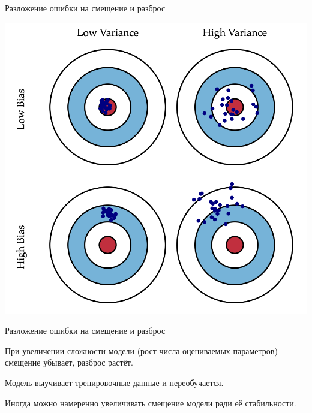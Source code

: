 \documentclass[notes,12pt, aspectratio=169]{beamer}
\newenvironment{wideitemize}{\itemize\addtolength{\itemsep}{10pt}}{\enditemize}
\begin{document}
\begin{frame}{Разложение ошибки на смещение и разброс}
	\begin{center}
		\includegraphics[scale=0.23]{est_var.png}
	\end{center}
\end{frame}


\begin{frame}{Разложение ошибки на смещение и разброс}
	\begin{wideitemize}
			
			\item  При увеличении сложности модели (рост числа оцениваемых параметров) смещение убывает, разброс растёт.
			
			\item Модель выучивает тренировочные данные и переобучается.  
			
			\item \alert{Иногда можно намеренно увеличивать смещение модели ради её стабильности.}
			
		\end{wideitemize}
\end{frame}
\end{document}

